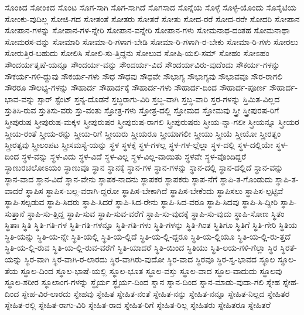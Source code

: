 {ಸೊಂಕಿದ
ಸೋಂಕಿದ
ಸೊಂಟ
ಸೊಗ-ಸಾಗಿ
ಸೊಗ-ಸಾಗಿದೆ
ಸೊಗಸಾದ
ಸೊನ್ನೆಯ
ಸೊಳ್ಳೆ
ಸೊಳ್ಳೆ-ಯೊಂದು
ಸೊಸೈಟಿಯ
ಸೋಂಕು-ವುದಿಲ್ಲ
ಸೋಜಿ-ಗದ
ಸೋತಂತೆ
ಸೋತರು
ಸೋತರೆ
ಸೋತು
ಸೋದ-ರರೆ
ಸೋದ-ರರೇ
ಸೋದರಿ
ಸೋಪಾನ
ಸೋಪಾನ-ಗಳನ್ನು
ಸೋಪಾನ-ಗಳ-ನ್ನೇರಿ
ಸೋಪಾನ-ವನ್ನೇರಿ
ಸೋಪಾನ-ಗಳು
ಸೋಮನಾಥ-ದಂತಹ
ಸೋಮನಾಥಾ
ಸೋಮರಸ-ವನ್ನು
ಸೋಮಾರಿ
ಸೋಮಾ-ರಿ-ಗಳಾಗ-ಬೇಡಿ
ಸೋಮಾ-ರಿ-ಗಳಾಗಿ-ರ-ಬೇಕು
ಸೋಮಾ-ರಿ-ಗಳು
ಸೋರಲು
ಸೋರುತ್ತಿರ-ಬಹುದು
ಸೋಲಿಸಿ
ಸೋಲಿ-ಸು-ತ್ತಿದ್ದನು
ಸೋಲುವ
ಸೋಷಿ-ಯಲಿ-ಸಮ್
ಸೋಹಂ
ಸೋಽಹಂ
ಸೌಂದರ್ಯತೃಷೆ-ಯನ್ನೂ
ಸೌಂದರ್ಯ-ವನ್ನು
ಸೌಂದರ್ಯ-ವಿದೆ
ಸೌಂದರ್ಯವಿರು-ವುದೆಂದು
ಸೌಕರ್ಯ-ಗಳನ್ನು
ಸೌಕರ್ಯ-ಗಳಿ-ದ್ದುವು
ಸೌಕರ್ಯ-ಗಳು
ಸೌಧ
ಸೌಧವು
ಸೌಧವೇ
ಸೌಭಾಗ್ಯ
ಸೌಭಾಗ್ಯವು
ಸೌಭಾವವೂ
ಸೌರ-ರಾಗಲಿ
ಸೌರರೂ
ಸೌಲಭ್ಯ-ಗಳನ್ನು
ಸೌಹಾರ್ದ
ಸೌಹಾರ್ದಕ್ಕೆ
ಸೌಹಾರ್ದ-ಗಳು
ಸೌಹಾರ್ದ-ದಿಂದ
ಸೌಹಾರ್ದ-ಪೂರ್ಣ
ಸೌಹಾರ್ದ-ಭಾವ-ವನ್ನು
ಸ್ಟಾರ್
ಸ್ಟೆಂಟ್
ಸ್ತನ್ಯ-ದೊಡನೆ
ಸ್ತಬ್ಧರಾಗು-ವಿರಿ
ಸ್ತಬ್ಧ-ವಾಗಿ
ಸ್ತಬ್ಧ-ವಾರಿ
ಸ್ತರ-ಗಳನ್ನು
ಸ್ತಿಮಿತ-ವಿಲ್ಲದ
ಸ್ತುತಿಸಿ-ರುವ
ಸ್ತುತಿಸು-ವರು
ಸ್ತು-ವಂತು
ಸ್ತೋತ್ರ-ಗಳು
ಸ್ತೋತ್ರ-ದಲ್ಲಿ
ಸ್ತೋಮದ
ಸ್ತೋಮವು
ಸ್ತ್ರೀ
ಸ್ತ್ರೀಪುರಷ-ರಿಗೆ
ಸ್ತ್ರೀಪುರುಷ
ಸ್ತ್ರೀಪುರುಷ-ಮಕ್ಕಳ
ಸ್ತ್ರೀಪುರುಷರ
ಸ್ತ್ರೀಪುರುಷ-ರಾಗಲಿ
ಸ್ತ್ರೀಪುರುಷರು
ಸ್ತ್ರೀಯ-ನ್ನಾ-ಗಲೀ
ಸ್ತ್ರೀಯನ್ನೂ
ಸ್ತ್ರೀಯರ
ಸ್ತ್ರೀಯ-ರಂತೆ
ಸ್ತ್ರೀಯ-ರನ್ನು
ಸ್ತ್ರೀಯ-ರಿಗೆ
ಸ್ತ್ರೀಯರು
ಸ್ತ್ರೀಯರೂ
ಸ್ತ್ರೀಯಾಗಲೀ
ಸ್ತ್ರೀಯು
ಸ್ತ್ರೀಯೆ
ಸ್ತ್ರೀಯೋ
ಸ್ತ್ರೀರತ್ನಂ
ಸ್ತ್ರೀರತ್ನವು
ಸ್ತ್ರೀಲಂಪಟ
ಸ್ತ್ರೀಸಮಸ್ಯೆ-ಯನ್ನು
ಸ್ಥಳ
ಸ್ಥಳಕ್ಕೆ
ಸ್ಥಳ-ಗಳಲ್ಲ
ಸ್ಥಳ-ಗಳ-ಲ್ಲೆಲ್ಲಾ
ಸ್ಥಳ-ದಲ್ಲಿ
ಸ್ಥಳ-ದಲ್ಲಿಯೇ
ಸ್ಥಳ-ದಿಂದ
ಸ್ಥಳ-ವನ್ನು
ಸ್ಥಳ-ವಿದು
ಸ್ಥಳ-ವಿದೆ
ಸ್ಥಳ-ವಿಲ್ಲ
ಸ್ಥಳ-ವಿಲ್ಲ-ವಾಯಿತು
ಸ್ಥಳವೇ
ಸ್ಥಳ-ವೊಂದಿದ್ದರೆ
ಸ್ಥಾಣುರಚಲೋಽಯಂ
ಸ್ಥಾಣುವೂ
ಸ್ಥಾನ
ಸ್ಥಾನಕ್ಕೆ
ಸ್ಥಾನ-ಗಳ
ಸ್ಥಾನ-ಗಳನ್ನು
ಸ್ಥಾನ-ದಲ್ಲಿ
ಸ್ಥಾನ-ದಲ್ಲಿದೆ
ಸ್ಥಾನ-ವನ್ನು
ಸ್ಥಾನ-ವಾದ
ಸ್ಥಾನ-ವಿದೆ
ಸ್ಥಾನ-ವೇನು
ಸ್ಥಾಪಕ-ನಾದನು
ಸ್ಥಾಪಕರ
ಸ್ಥಾಪಕರು
ಸ್ಥಾಪ-ನೆಗೆ
ಸ್ಥಾಪಿ-ತ-ಗೊಂಡುದು
ಸ್ಥಾಪಿ-ತ-ವಾದರೆ
ಸ್ಥಾಪಿಸ
ಸ್ಥಾಪಿಸ-ಬಲ್ಲ-ವರಾಗಿ-ದ್ದರೋ
ಸ್ಥಾಪಿಸ-ಬೇಕಾಗಿದೆ
ಸ್ಥಾಪಿಸ-ಬೇಕೆಂದು
ಸ್ಥಾಪಿಸಲು
ಸ್ಥಾಪಿಸ-ಲ್ಪಟ್ಟಿವೆ
ಸ್ಥಾಪಿ-ಸಲ್ಪಡುವ
ಸ್ಥಾಪಿ-ಸಿದರು
ಸ್ಥಾಪಿ-ಸಿದರೆ
ಸ್ಥಾಪಿ-ಸಿದ-ರೇನು
ಸ್ಥಾಪಿ-ಸಿದ-ವರೂ
ಸ್ಥಾಪಿ-ಸಿದವು
ಸ್ಥಾಪಿ-ಸಿ-ದ್ದೀರಿ
ಸ್ಥಾಪಿ-ಸುತ್ತಾನೆ
ಸ್ಥಾಪಿ-ಸು-ತ್ತಿದ್ದ
ಸ್ಥಾಪಿ-ಸುವ
ಸ್ಥಾಪಿ-ಸುವ-ವರೆಗೆ
ಸ್ಥಾಪಿ-ಸು-ವುದಕ್ಕೆ
ಸ್ಥಾಪಿ-ಸು-ವುದು
ಸ್ಥಾಪಿ-ಸೋಣ
ಸ್ಥಿತಂ
ಸ್ಥಿತಾಃ
ಸ್ಥಿತಿ
ಸ್ಥಿತಿ-ಗತಿ-ಗಳ
ಸ್ಥಿತಿ-ಗತಿ-ಗಳನ್ನೂ
ಸ್ಥಿತಿ-ಗತಿ-ಗಳು
ಸ್ಥಿತಿ-ಗಳನ್ನು
ಸ್ಥಿತಿ-ಗಿಂತ
ಸ್ಥಿತಿಗೂ
ಸ್ಥಿತಿಗೆ
ಸ್ಥಿತಿ-ಗೇರಿ
ಸ್ಥಿತಿಯ
ಸ್ಥಿತಿ-ಯನ್ನು
ಸ್ಥಿತಿ-ಯ-ನ್ನೇ
ಸ್ಥಿತಿ-ಯಲ್ಲಿ
ಸ್ಥಿತಿ-ಯ-ಲ್ಲಿದೆ
ಸ್ಥಿತಿ-ಯ-ಲ್ಲಿ-ದ್ದರೂ
ಸ್ಥಿತಿ-ಯ-ಲ್ಲಿಯೂ
ಸ್ಥಿತಿ-ಯ-ಲ್ಲಿ-ರು-ತ್ತದೆ
ಸ್ಥಿತಿ-ಯ-ಲ್ಲಿ-ರುವ
ಸ್ಥಿತಿ-ಯ-ಲ್ಲಿ-ರುವ-ವರೆಗೆ
ಸ್ಥಿತಿ-ಯಾದರೆ
ಸ್ಥಿತಿ-ಯಿಂದ
ಸ್ಥಿತಿಯು
ಸ್ಥಿತಿ-ಲಯ-ಗಳಿ-ಗೆಲ್ಲಾ
ಸ್ಥಿರ
ಸ್ಥಿರತೆ-ಯನ್ನು
ಸ್ಥಿರ-ವಾಗಿ
ಸ್ಥಿರ-ವಾಗಿ-ರ-ಲಾರದು
ಸ್ಥಿರ-ವಾಗಿರು-ವುದೋ
ಸ್ಥಿರ-ವಾದ
ಸ್ಥಿರವೂ
ಸ್ಥಿರ-ಸ್ವ-ಭಾವದ
ಸ್ಥೂಲ
ಸ್ಥೂಲ-ತೆಯ
ಸ್ಥೂಲ-ದಿಂದ
ಸ್ಥೂಲ-ಭಾಷೆ-ಯಲ್ಲಿ
ಸ್ಥೂಲ-ಭೂತ
ಸ್ಥೂಲ-ವಸ್ತು
ಸ್ಥೂಲ-ವಾದ
ಸ್ಥೂಲ-ವಾದುದು
ಸ್ಥೂಲವು
ಸ್ಥೂಲ-ಶರೀರ
ಸ್ಥೂಲಾಂಗ-ಗಳನ್ನು
ಸ್ಥೈರ್ಯ
ಸ್ಥೈರ್ಯ-ದಿಂದ
ಸ್ನಾನ
ಸ್ನಾನ-ದಿಂದ
ಸ್ನಾನ-ಮಾಡು-ವುದಾ-ಗಲಿ
ಸ್ನೇಹ
ಸ್ನೇಹ-ದಿಂದ
ಸ್ನೇಹ-ವಿರ-ಲಾರದು
ಸ್ನೇಹವು
ಸ್ನೇಹಿತ
ಸ್ನೇಹಿತ-ನಂತೆ
ಸ್ನೇಹಿತ-ನನ್ನು
ಸ್ನೇಹಿತ-ನನ್ನೂ
ಸ್ನೇಹಿತ-ನಿಲ್ಲದ
ಸ್ನೇಹಿತರ
ಸ್ನೇಹಿತ-ರಲ್ಲಿ
ಸ್ನೇಹಿತ-ರಾಗು-ವಿರಿ
ಸ್ನೇಹಿತ-ರಾದ
ಸ್ನೇಹಿತ-ರಿಗೆ
ಸ್ನೇಹಿತ-ರಿಲ್ಲ
ಸ್ನೇಹಿತರು
ಸ್ನೇಹಿತರೂ
ಸ್ನೇಹಿತರೆ
}
